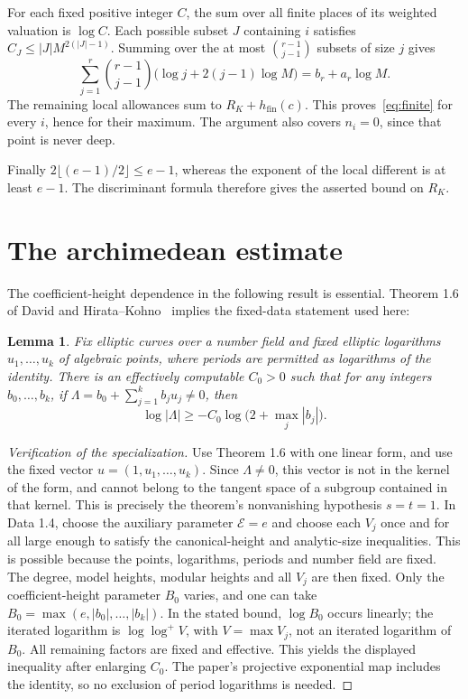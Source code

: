 \documentclass[11pt,a4paper]{article}
\newtheorem{lemma}[theorem]{Lemma}
\newcommand{\hfin}{h_{\mathrm{fin}}}
\begin{document}
For each fixed positive integer $C$, the sum over all finite
places of its weighted valuation is $\log C$. Each possible
subset $J$ containing $i$ satisfies
$C_J\le |J|M^{2(|J|-1)}$. Summing over the at most
$\binom{r-1}{j-1}$ subsets of size $j$ gives
\[
 \sum_{j=1}^r\binom{r-1}{j-1}
       \bigl(\log j+2(j-1)\log M\bigr)
                  =b_r+a_r\log M.
\]
The remaining local allowances sum to $R_K+\hfin(c)$. This
proves~\eqref{eq:finite} for every $i$, hence for their maximum.
The argument also covers $n_i=0$, since that point is never deep.

Finally $2\lfloor(e-1)/2\rfloor\le e-1$, whereas the exponent
of the local different is at least $e-1$. The discriminant formula
therefore gives the asserted bound on $R_K$.

\section{The archimedean estimate}
The coefficient-height dependence in the following result is
essential. Theorem 1.6 of David and Hirata--Kohno~\cite{DHK}
implies the fixed-data statement used here:

\begin{lemma}\label{lem:dhk}
Fix elliptic curves over a number field and fixed elliptic
logarithms $u_1,\ldots,u_k$ of algebraic points, where periods
are permitted as logarithms of the identity. There is an
effectively computable $C_0>0$ such that for any integers
$b_0,\ldots,b_k$, if
$\Lambda=b_0+\sum_{j=1}^k b_j u_j\ne0$, then
\[
 \log|\Lambda|\ge-C_0\log\bigl(2+\max_j|b_j|\bigr).
\]
\end{lemma}
\begin{proof}[Verification of the specialization]
Use Theorem 1.6 with one linear form, and use the fixed vector
$u=(1,u_1,\ldots,u_k)$. Since $\Lambda\ne0$, this vector is not
in the kernel of the form, and cannot belong to the tangent
space of a subgroup contained in that kernel. This is precisely
the theorem's nonvanishing hypothesis $s=t=1$.
In Data 1.4, choose the auxiliary parameter $\mathcal E=e$ and
choose each $V_j$ once and for all large enough to satisfy the
canonical-height and analytic-size inequalities. This is possible
because the points, logarithms, periods and number field are
fixed. The degree, model heights, modular heights and all $V_j$
are then fixed. Only the coefficient-height parameter $B_0$
varies, and one can take $B_0=\max(e,|b_0|,\ldots,|b_k|)$.
In the stated bound, $\log B_0$ occurs linearly; the iterated
logarithm is $\log\log^+ V$, with $V=\max V_j$, not an iterated
logarithm of $B_0$. All remaining factors are fixed and effective.
This yields the displayed inequality after enlarging $C_0$.
The paper's projective exponential map includes the identity,
so no exclusion of period logarithms is needed.
\end{proof}
\end{document}
